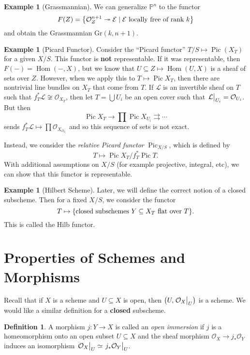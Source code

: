 \documentclass[leqno, openany]{memoir}
\theoremstyle{definition}
\newtheorem{defn}[thm]{Definition}
\newtheorem{exm}[thm]{Example}
\theoremstyle{remark}
\theoremstyle{plain}
\theoremstyle{definition}
\theoremstyle{remark}
\renewcommand{\P}{\mathbb{P}}
\newcommand{\mc}[1]{\mathcal{#1}}
\newcommand{\mr}[1]{\mathrm{#1}}
\DeclareMathOperator{\Hom}{Hom}
\DeclareMathOperator{\Pic}{Pic}
\begin{document}
\begin{exm}[Grassmannian]
    We can generalize $\P^n$ to the functor
    \[ F(Z) = \qty{\mc{O}_Z^{n+1} \twoheadrightarrow \mc{E} \mid \mc{E}\ \text{locally free of rank $k$}} \]
    and obtain the Grassmannian $\mr{Gr}(k, n+1)$.
\end{exm}

\begin{exm}[Picard Functor]
    Consider the ``Picard functor'' $T/S \mapsto \Pic(X_T)$ for a given $X/S$. This functor is \textbf{not} representable. If it was representable, then $F(-) = \Hom(-,X)$, but we know that $U \subseteq Z \mapsto \Hom(U,X)$ is a sheaf of sets over $Z$. However, when we apply this to $T \mapsto \Pic X_T$, then there are nontrivial line bundles on $X_T$ that come from $T$. If $\mc{L}$ is an invertible sheaf on $T$ such that $f^*_T \mc{L} \not\cong \mc{O}_{X_T}$, then let $T = \bigcup U_i$ be an open cover such that $\eval{\mc{L}}_{U_i} = \mc{O}_{U_i}$. But then
    \[ \Pic X_T \to \prod \Pic X_{U_i} \rightrightarrows \cdots \]
    sends $f_T^* \mc{L} \mapsto \prod \mc{O}_{X_{\mc{O}_{U_i}}}$ and so this sequence of sets is not exact.

    Instead, we consider the \textit{relative Picard functor} $\Pic_{X/S}$, which is defined by
    \[ T \mapsto \Pic X_T / f_T^* \Pic T. \]
    With additional assumptions on $X/S$ (for example projective, integral, etc), we can show that this functor is representable.
\end{exm}

\begin{exm}[Hilbert Scheme]
    Later, we will define the correct notion of a closed subscheme. Then for a fixed $X/S$, we consider the functor
    \[ T \mapsto \qty{\text{closed subschemes}\ Y \subseteq X_T\ \text{flat over $T$}}. \]
    This is called the $\mr{Hilb}$ functor.
\end{exm}

\section{Properties of Schemes and Morphisms}%
\label{sec:properties_of_schemes_and_morphisms}

Recall that if $X$ is a scheme and $U \subseteq X$ is open, then $\qty(U, \eval{\mc{O}_X}_U)$ is a scheme. We would like a similar definition for a \textbf{closed} subscheme.

\begin{defn}
    A morphism $j \colon Y \to X$ is called an \textit{open immersion} if $j$ is a homeomorphism onto an open subset $U \subseteq X$ and the sheaf morphism $\mc{O}_X \to j_* \mc{O}_Y$ induces an isomorphism $\eval{\mc{O}_X}_U \simeq \eval{j_* \mc{O}_Y}_U$.
\end{defn}
\end{document}

